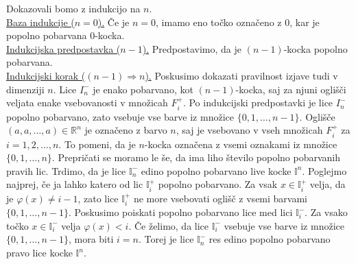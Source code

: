 \documentclass[mat1]{fmfdelo}
\newcommand{\R}{\mathbb R}
\newcommand{\I}{\mathbb I}
\newcommand{\0}{\underline{0}}
\begin{document}
\begin{dokaz}
\begin{figure}[h!]
\end{figure}
%
Dokazovali bomo z indukcijo na $n$.\\
\underline{Baza indukcije ($n = 0$).}
Če je $n=0$, imamo eno točko označeno z $0$, kar je popolno pobarvana $0$-kocka.\\
\underline{Indukcijska predpostavka ($n - 1$).}
Predpostavimo, da je $(n-1)$-kocka popolno pobarvana. \\
\underline{Indukcijski korak ($(n - 1) \Longrightarrow n$).}
Poskusimo dokazati pravilnost izjave tudi v dimenziji $n$. Lice $I_n^-$ je enako pobarvano, kot $(n-1)$-kocka, saj za njuni oglišči veljata enake vsebovanosti v množicah $F_i^+$. Po indukcijski predpostavki je lice $I_n^-$ popolno pobarvano, zato vsebuje vse barve iz množice $\{ 0, 1, \dots, n-1\}$. Oglišče $(a, a, \dots, a) \in \R^n$ je označeno z barvo $n$, saj je vsebovano v vseh množicah $F_i^+$ za $i = 1, 2, \dots, n$. To pomeni, da je $n$-kocka označena z vsemi oznakami iz množice $\{ 0, 1, \dots, n \}$. Prepričati se moramo le še, da ima liho število popolno pobarvanih pravih lic. 
Trdimo, da je lice $\I_n^-$ edino popolno pobarvano live kocke $\I^n$. Poglejmo najprej, če ja lahko katero od lic $\I_i^+$ popolno pobarvano. Za vsak $x \in \I_i^+$ velja, da je $\varphi (x) \neq i-1$, zato lice $\I_i^+$ ne more vsebovati oglišč z vsemi barvami $\{ 0, 1, \dots, n - 1 \}$. Poskusimo poiskati popolno pobarvano lice med lici $\I_i^-$. Za vsako točko $x \in \I_i^-$ velja $\varphi (x) < i$. Če želimo, da lice $\I_i^-$ vsebuje vse barve iz množice $\{ 0, 1, \dots, n - 1 \}$, mora biti $i = n$. Torej je lice $\I_n^-$ res edino popolno pobarvano pravo lice kocke $\I^n$.


\end{dokaz}
\end{document}
